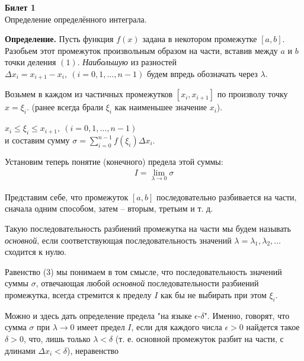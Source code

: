 \documentclass[a4paper]{report}
\begin{document}
\setlength{\parskip}{6pt}

\noindent
\begin{center}
    \textbf{Билет 1}\\
    Определение определённого интеграла.\\
\end{center}

\textbf{Определение.} Пусть функция $ f(x) $ задана в некотором промежутке $ [a, b] $.
Разобьем этот промежуток произвольным образом на части, вставив между $ a $ и $ b $
точки деления $ (1) $. \emph{Наибольшую} из разностей
$ \Delta x_i = x_{i + 1} - x_{i},\ (i = 0, 1, \ldots, n - 1) $ будем впредь
обозначать через $ \lambda $.

Возьмем в каждом из частичных промежутков $ [x_i, x_{i + 1}] $ по произволу точку 
$ x = \xi_i $. (ранее всегда брали $ \xi_i $ как наименьшее значение $ x_i $).

\begin{center}
    $ x_i \leq \xi_i \leq x_{i + 1},\ (i = 0, 1, \ldots, n - 1) $\\
    и составим сумму $ \sigma = \sum\limits_{i = 0}^{n - 1} f(\xi_i) \Delta x_i $.
\end{center}

\begin{center}
    Установим теперь понятие (конечного) предела этой суммы:\\ 
    \begin{equation}\label{eq3}
        \begin{gathered}
            I = \lim\limits_{\lambda \to 0}{\sigma}
        \end{gathered}
    \end{equation}
\end{center}
Представим себе, что промежуток $ [a, b] $ последовательно разбивается на части,
сначала одним способом, затем -- вторым, третьим и т. д.

\noindent Такую последовательность разбиений промежутка на части мы будем называть 
\emph{основной}, если соответствующая последовательность значений 
$ \lambda = \lambda_1, \lambda_2, \ldots $ сходится к нулю.

Равенство (3) мы понимаем в том смысле, что последовательность значений суммы
$ \sigma $, отвечающая любой \emph{основной} последовательности разбиений промежутка,
всегда стремится к пределу $ I $ как бы не выбирать при этом $ \xi_i $.

Можно и здесь дать определение предела "на языке $ \epsilon $-$ \delta $". Именно,
говорят, что сумма $ \sigma $ при $ \lambda \to 0 $ имеет предел $ I $, если для
каждого числа $ \epsilon > 0 $ найдется такое $ \delta > 0 $, что, лишь только
$ \lambda < \delta $ (т. е. основной промежуток разбит на части, с длинами 
$ \Delta x_i < \delta $), неравенство 
\end{document}
